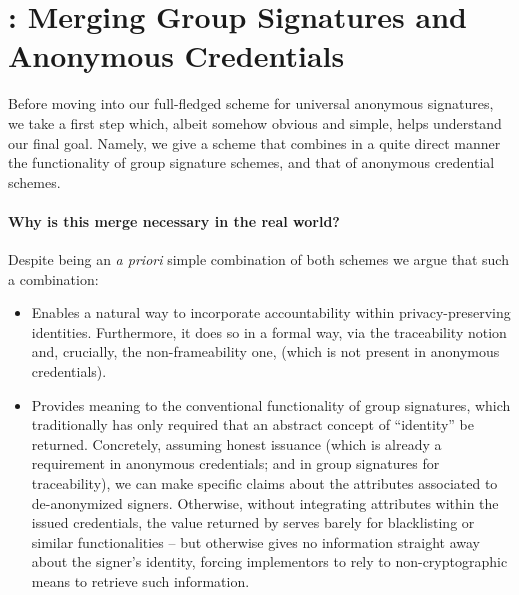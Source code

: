 \section{\GSAC: Merging Group Signatures and Anonymous
  Credentials}
\label{sec:gsac}


Before moving into our full-fledged scheme for universal anonymous signatures,
we take a first step which, albeit somehow obvious and simple, helps understand
our final goal. Namely, we give a scheme that combines in a quite direct manner
the functionality of group signature schemes, and that of anonymous credential
schemes.

\paragraph{Why is this merge necessary in the real world?} %
Despite being an \emph{a priori} simple combination of both schemes we argue
that such a combination:

\begin{itemize}
\item Enables a natural way to incorporate accountability within 
  privacy-preserving identities. Furthermore, it does so in a formal way,
  via the traceability notion and, crucially, the non-frameability one,
  (which is not present in anonymous credentials).
\item Provides meaning to the conventional \Open functionality of group
  signatures, which traditionally has only required that an abstract concept of
  ``identity'' be returned. Concretely, assuming honest issuance (which is
  already a requirement in anonymous credentials; and in group signatures for
  traceability), we can make specific claims about the attributes associated to
  de-anonymized signers. Otherwise, without integrating attributes within the
  issued credentials, the value returned by \Open serves barely for blacklisting
  or similar functionalities -- but otherwise gives no information straight away
  about the signer's identity, forcing implementors to rely to non-cryptographic
  means to retrieve such information.
\end{itemize}


